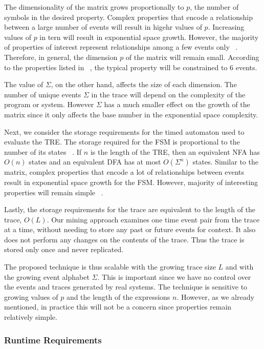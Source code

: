 \documentclass[]{sigplanconf}
\begin{document}
The dimensionality of the matrix grows proportionally to $p$, the number of symbols in the desired property.
Complex properties that encode a relationship between a large number of events will result in higehr values of $p$.
Increasing values of $p$ in tern will result in exponential space growth.
However, the majority of properties of interest represent relationships among a few events only ~\cite{evans1, dwyer1999patterns}.
Therefore, in general, the dimension $p$ of the matrix will remain small.
According to the properties listed in ~\cite{dwyer1999patterns, dwyer2}, the typical property will be constrained to 6 events.

The value of $\Sigma$, on the other hand, affects the size of each dimension.
The number of unique events $\Sigma$ in the trace will depend on the complexity of the program or system.
However $\Sigma$ has a much smaller effect on the growth of the matrix since it only affects the base number in the
exponential space complexity.


Next, we consider the storage requirements for the timed automaton used to evaluate the TRE.
The storage required for the FSM is proportional to the number of its states ~\cite{book1}.
If $n$ is the length of the TRE, then an equivalent NFA has $O(n)$ states and an equivalent DFA has at most $O(\Sigma^n)$ states. Similar to the matrix, complex properties that encode a lot of relationships between events result in exponential space growth for the FSM. However, majority of interesting properties will remain simple ~\cite{dwyer1999patterns}.


Lastly, the storage requirements for the trace are equivalent to the length of the trace, $O(L)$.
Our mining approach examines one time event pair from the trace at a time, without needing to
store any past or future events for context. It also does not perform any changes on the
contents of the trace. Thus the trace is stored only once and never replicated.

The proposed technique is thus scalable with the growing trace size $L$ and with the growing event alphabet $\Sigma$. This is important since we have no control over the events and traces generated by real systems. The technique is sensitive to growing values of $p$ and the length of the expressions $n$. However, as we already mentioned, in practice this will not be a concern since properties remain relatively simple.


\subsubsection{Runtime Requirements}
\end{document}
